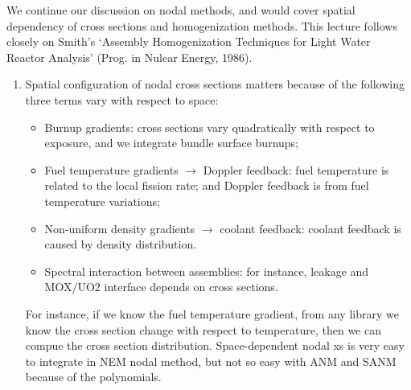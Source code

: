 \documentclass{school-22.211-notes}
\date{May  7, 2012}
\begin{document}
\maketitle

 \label{homogenization}
We continue our discussion on nodal methods, and would cover spatial dependency of cross sections and homogenization methods. This lecture follows closely on Smith's `Assembly Homogenization Techniques for Light Water Reactor Analysis' (Prog. in Nulear Energy, 1986). 




\begin{enumerate}
\item Spatial configuration of nodal cross sections matters because of the following three terms vary with respect to space:
\begin{itemize}
\item Burnup gradients: cross sections vary quadratically with respect to exposure, and we integrate bundle surface burnups;

\item Fuel temperature gradients $\to$ Doppler feedback: fuel temperature is related to the local fission rate; and Doppler feedback is from fuel temperature variations;

\item Non-uniform density gradients $\to$ coolant feedback: coolant feedback is caused by density distribution.

\item Spectral interaction between assemblies: for instance, leakage and MOX/UO2 interface depends on cross sections.
\end{itemize}
For instance, if we know the fuel temperature gradient, from any library we know the cross section change with respect to temperature, then we can compue the cross section distribution. Space-dependent nodal xs is very easy to integrate in NEM nodal method, but not so easy with ANM and SANM because of the polynomials. 


\end{enumerate}
\end{document}
